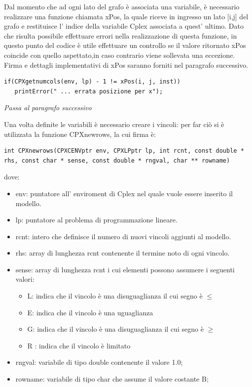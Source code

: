 \documentclass[11pt]{article}
\begin{document}
Dal momento che ad ogni lato del grafo \`e associata una variabile, \`e necessario realizzare una funzione chiamata xPos, la quale riceve in ingresso un lato [i,j] del grafo e restituisce l' indice della variabile Cplex associata a quest' ultimo. Dato che risulta possibile effettuare errori nella realizzazione di questa funzione, in questo punto del codice \`e  utile effettuare un controllo se il valore ritornato xPos coincide con quello aspettato,in caso contrario viene sollevata una eccezione. Firma e dettagli implementativi di xPos saranno forniti nel paragrafo successivo.


\begin{lstlisting}
if(CPXgetnumcols(env, lp) - 1 != xPos(i, j, inst))
   printError(" ... errata posizione per x");
\end{lstlisting}


\textit{Passa al paragrafo successivo}

Una volta definite le variabili \`e necessario creare i vincoli: per far ci\`o si \`e utilizzata la funzione CPXnewrows, la cui firma \`e:

\begin{lstlisting}
int CPXnewrows(CPXCENVptr env, CPXLPptr lp, int rcnt, const double * rhs, const char * sense, const double * rngval, char ** rowname)
\end{lstlisting}

dove:

\begin{itemize}
\item env: puntatore all' enviroment di Cplex nel quale vuole essere inserito il modello.
\item lp: puntatore al problema di programmazione lineare.
\item rcnt: intero che definisce il numero di nuovi vincoli aggiunti al modello.
\item rhs: array di lunghezza rcnt contenente il termine noto di ogni vincolo.
\item sense: array di lunghezza rcnt i cui elementi possono assumere i seguenti valori:

\begin{itemize}
\item {}L: indica che il vincolo \`e una disuguaglianza il cui segno \`e  $\leq$
\item {}E: indica che il vincolo \`e una uguaglianza
\item {}G: indica che il vincolo \`e una disuguaglianza il cui segno \`e $\geq$
\item {}R : indica che il vincolo \`e limitato 
\end{itemize}

\item rngval: variabile di tipo double contenente il valore 1.0;
\item rowname: variabile di tipo char che assume il valore costante B;
\end{itemize}
\end{document}
